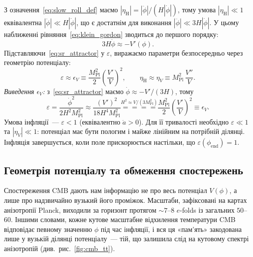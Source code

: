 \documentclass[12pt, a4paper]{article}
\begin{document}
З означення~\eqref{eq:slow_roll_def} маємо
$|\eta_\mathrm{H}| = |\ddot\phi|/(H|\dot\phi|)$, тому умова
$|\eta_\mathrm{H}| \ll 1$ еквівалентна $|\ddot\phi| \ll H|\dot\phi|$,
що є достатнім для виконання $|\ddot\phi| \ll 3H|\dot\phi|$.
У цьому наближенні рівняння~\eqref{eq:klein_gordon} зводиться
до першого порядку:
\begin{equation}\label{eq:sr_attractor}
  3H\dot{\phi} \approx -V'(\phi).
\end{equation}
Підставляючи~\eqref{eq:sr_attractor} у $\varepsilon$, виражаємо
параметри безпосередньо через геометрію потенціалу:
\begin{equation}\label{eq:slow_roll_pot}
  \varepsilon \approx \epsilon_V
    \equiv \frac{M_\mathrm{Pl}^2}{2}\!\left(\frac{V'}{V}\right)^2,
  \qquad
  \eta_{\mathrm{H}} \approx \eta_V
    \equiv M_\mathrm{Pl}^2\,\frac{V''}{V}.
\end{equation}
\textit{Виведення $\epsilon_V$:} з~\eqref{eq:sr_attractor}
маємо $\dot\phi \approx -V'/(3H)$, тому
\begin{equation*}
  \varepsilon
    = \frac{\dot\phi^2}{2H^2 M_\mathrm{Pl}^2}
    \approx \frac{(V')^2}{18 H^4 M_\mathrm{Pl}^2}
    \overset{H^2\approx V/(3M_\mathrm{Pl}^2)}{=\!=\!=\!=}
    \frac{M_\mathrm{Pl}^2}{2}\!\left(\frac{V'}{V}\right)^2
    \equiv \epsilon_V.
\end{equation*}
Умова інфляції~--- $\varepsilon < 1$ (еквівалентно $\ddot{a} > 0$).
Для її тривалості необхідно $\varepsilon \ll 1$ та $|\eta_V| \ll 1$:
потенціал має бути пологим і майже лінійним на потрібній ділянці.
Інфляція завершується, коли поле прискорюється настільки, що
$\varepsilon(\phi_{\mathrm{end}}) = 1$.

\subsection{Геометрія потенціалу та обмеження спостережень}

Спостереження CMB дають нам інформацію не про весь потенціал
$V(\phi)$, а лише про надзвичайно вузький його проміжок. Масштаби,
зафіксовані на картах анізотропії Planck, виходили за горизонт
протягом $\sim\!7$--$8$ $e$-folds із загальних $50$--$60$. Іншими
словами, кожне кутове масштабне відхилення температури CMB
відповідає певному значенню $\phi$ під час інфляції, і вся ця
«пам'ять» закодована лише у вузькій ділянці потенціалу~---
тій, що залишила слід на кутовому спектрі анізотропій
(див.\ рис.~\ref{fig:cmb_tt}).
\end{document}
